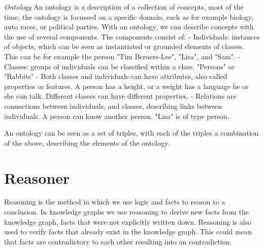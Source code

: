 \documentclass[11pt,letterpaper ,oneside ]{book}
\begin{document}
	\textit{Ontology} An ontology is a description of a collection of concepts, most of the time, the ontology is focussed on a specific domain, such as for example biology, auto races, or political parties. With an ontology, we can describe concepts with the use of several components. The components consist of:
	- Individuals: instances of objects, which can be seen as instantiated or grounded elements of classes. This can be for example the person "Tim Berners-Lee", "Lisa", and "Sam".
	- Classes: groups of individuals can be classified within a class. "Persons" or "Rabbits"
	- Both classes and individuals can have attributes, also called properties or features. A person has a height, or a weight has a language he or she can talk. Different classes can have different properties. 
	- Relations are connections between individuals, and classes, describing links between individuals. A person can know another person. "Lisa" is of type person. 
	
	An ontology can be seen as a set of triples, with each of the triples a combination of the above, describing the elements of the ontology.
	
	\section{Reasoner}
	Reasoning is the method in which we use logic and facts to reason to a conclusion. In knowledge graphs we use reasoning to derive new facts from the knowledge graph, facts that were not explicitly written down. Reasoning is also used to verify facts that already exist in the knowledge graph. This could mean that facts are contradictory to each other resulting into an contradiction.
	
	
\end{document}

